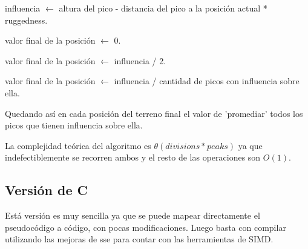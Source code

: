 \begin{algorithm}
\begin{algorithmic}

		\State influencia $\gets$ altura del pico - distancia del pico a la posición actual * ruggedness.
	\EndFor
	
		\State valor final de la posición $\gets$ 0.
	
		\State valor final de la posición $\gets$ influencia / 2.
	
		\State valor final de la posición $\gets$ influencia / cantidad de picos con influencia sobre ella.
		
	\EndIf

\EndFor

\end{algorithmic}
\end{algorithm}

Quedando así en cada posición del terreno final el valor de 'promediar' todos los picos que tienen influencia sobre ella.

La complejidad teórica del algoritmo es $\theta(divisions*peaks)$ ya que indefectiblemente se recorren ambos y el resto de las operaciones son $O(1)$.

\subsection{Versión de C}
Está versión es muy sencilla ya que se puede mapear directamente el pseudocódigo a código, con pocas modificaciones. Luego basta con compilar utilizando las mejoras de sse para contar con las herramientas de SIMD.

